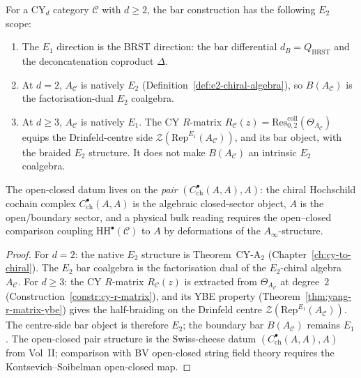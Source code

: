 \begin{proposition}[\texorpdfstring{$E_2$}{E-2} enhancement of the bar coalgebra: native at \texorpdfstring{$d=2$}{d=2}, centre-side at \texorpdfstring{$d\geq3$}{d>=3}]
\label{prop:phys-bv-e2-bar}
For a CY$_d$ category $\mathcal{C}$ with $d \geq 2$, the bar construction has the following \(E_2\) scope:
\begin{enumerate}[label=\textup{(\roman*)}]
 \item The $E_1$ direction is the BRST direction: the bar differential $d_B=Q_{\mathrm{BRST}}$ and the deconcatenation coproduct $\Delta$.
 \item At \(d=2\), \(A_\mathcal{C}\) is natively \(E_2\) (Definition~\ref{def:e2-chiral-algebra}), so \(B(A_\mathcal{C})\) is the factorisation-dual \(E_2\) coalgebra.
 \item At \(d\geq3\), \(A_\mathcal{C}\) is natively \(E_1\). The CY \(R\)-matrix \(R_\mathcal{C}(z)=\mathrm{Res}^{\mathrm{coll}}_{0,2}(\Theta_{A_\mathcal{C}})\) equips the Drinfeld-centre side \(\mathcal{Z}(\mathrm{Rep}^{E_1}(A_\mathcal{C}))\), and its bar object, with the braided \(E_2\) structure. It does not make \(B(A_\mathcal{C})\) an intrinsic \(E_2\) coalgebra.
\end{enumerate}
The open-closed datum lives on the \emph{pair}
$(C^\bullet_{\mathrm{ch}}(A,A), A)$: the chiral Hochschild cochain
complex $C^\bullet_{\mathrm{ch}}(A,A)$ is the algebraic closed-sector
object, $A$ is the open/boundary sector, and a physical bulk reading
requires the open--closed comparison coupling
$\mathrm{HH}^\bullet(\mathcal{C})$ to $A$ by deformations of the
$A_\infty$-structure.
\end{proposition}

\begin{proof}
For $d = 2$: the native $E_2$ structure is Theorem~CY-A$_2$
(Chapter~\ref{ch:cy-to-chiral}). The $E_2$ bar coalgebra is the
factorisation dual of the $E_2$-chiral algebra $A_\mathcal{C}$. For
$d \geq 3$: the CY $R$-matrix $R_\mathcal{C}(z)$ is extracted from
$\Theta_{A_\mathcal{C}}$ at degree~$2$
(Construction~\ref{constr:cy-r-matrix}), and its YBE property
(Theorem~\ref{thm:yang-r-matrix-ybe}) gives the half-braiding on the
Drinfeld centre \(\mathcal{Z}(\mathrm{Rep}^{E_1}(A_\mathcal{C}))\).
The centre-side bar object is therefore \(E_2\); the boundary bar
\(B(A_\mathcal{C})\) remains \(E_1\). The open-closed pair structure
is the Swiss-cheese datum $(C^\bullet_{\mathrm{ch}}(A,A), A)$ from
Vol~II; comparison with BV open-closed string field theory requires
the Kontsevich--Soibelman open-closed map.
\end{proof}

